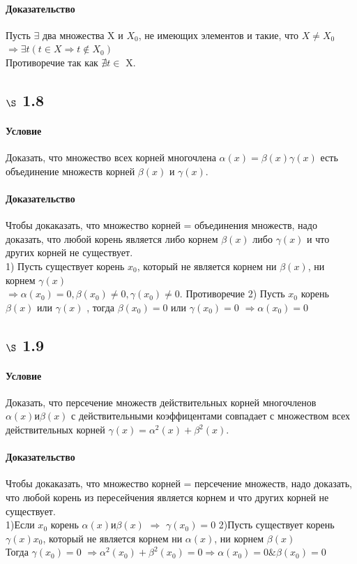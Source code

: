\documentclass[a4paper,12pt]{article}
\begin{document}
\paragraph*{Доказательство}
Пусть $\exists$ два множества X и $X_0$, не имеющих элементов и такие, что $X \not= X_0$\\
$ \Rightarrow \exists t ( t \in X \Rightarrow  t \not\in X_0 )$\\
Противоречие так как $\nexists t \in$ X.

\subsection*{$\S$ 1.8}
\paragraph*{Условие}
Доказать, что множество всех корней многочлена $\alpha (x)=\beta (x) \gamma (x)$ есть объединение множеств корней $\beta (x)$ и $\gamma(x)$.
\paragraph*{Доказательство}
Чтобы докаказать, что множество корней = объединения множеств, надо доказать, что любой корень является либо корнем $\beta (x)$ либо $\gamma(x)$ и что других корней не существует.\\
1) Пусть существует корень $x_0$, который не является корнем ни $\beta (x)$, ни корнем $\gamma(x)$ \\
$\Rightarrow \alpha (x_0) = 0, \beta (x_0) \not= 0,  \gamma (x_0) \not= 0$. Противоречие
2) Пусть $x_0$ корень $\beta (x)$ или  $\gamma(x)$ , тогда  $\beta (x_0) = 0$ или $\gamma(x_0) = 0$ $\Rightarrow \alpha(x_0) = 0$

\subsection*{$\S$ 1.9}
\paragraph*{Условие}
Доказать, что персечение множеств действительных корней многочленов  $\alpha (x) и \beta (x)$ с действительными коэффицентами  совпадает с множеством всех действительных корней $\gamma(x) =\alpha^2 (x) + \beta^2 (x)  $.
\paragraph*{Доказательство}
Чтобы докаказать, что множество корней = персечение множеств, надо доказать, что любой корень из пересейчения является корнем и что других корней не существует.\\
1)Если $x_0$ корень $\alpha (x) и \beta (x)$ $\Rightarrow$ $\gamma(x_0) = 0$
2)Пусть существует корень  $\gamma(x) x_0$, который не является корнем ни $\alpha (x)$, ни корнем $\beta(x)$ \\
Тогда $\gamma(x_0) = 0$ $\Rightarrow \alpha^2 (x_0) + \beta^2 (x_0) = 0 \Rightarrow  \alpha(x_0) =  0 \& \beta (x_0) = 0$
\end{document}

